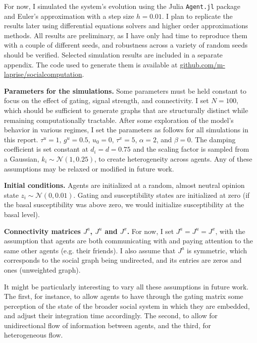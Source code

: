 \documentclass[]{article}
\begin{document}
For now, I simulated the system's evolution using the Julia \texttt{Agent.jl} package and Euler's approximation with a step size $h = 0.01$. I plan to replicate the results later using differential equations solvers and higher order approximations methods. All results are preliminary, as I have only had time to reproduce them with a couple of different seeds, and robustness across a variety of random seeds should be verified. Selected simulation results are included in a separate appendix. The code used to generate them is available at \href{http://github.com/m-laprise/socialcomputation}{github.com/m-laprise/socialcomputation}.

\textbf{Parameters for the simulations.} Some parameters must be held constant to focus on the effect of gating, signal strength, and connectivity. I set $N = 100$, which should be sufficient to generate graphs that are structurally distinct while remaining computationally tractable. After some exploration of the model's behavior in various regimes, I set the parameters as follows for all simulations in this report. $\tau^u = 1$, $g^u = 0.5$, $u_0=0$, $\tau^x = 5$, $\alpha = 2$, and $\beta = 0$. The damping coefficient is set constant at $d_i = d = 0.75$ and the scaling factor is sampled from a Gaussian, $k_i \sim \mathcal{N}(1,0.25)$, to create heterogeneity across agents. Any of these assumptions may be relaxed or modified in future work. 

\textbf{Initial conditions.} Agents are initialized at a random, almost neutral opinion state $z_i \sim \mathcal{N}(0, 0.01)$. Gating and susceptibility states are initialized at zero (if the basal susceptibility was above zero, we would initialize susceptibility at the basal level).

\textbf{Connectivity matrices $J^a$, $J^u$ and $J^x$.} For now, I set $J^a = J^u = J^x$, with the assumption that agents are both communicating with and paying attention to the same other agents (e.g. their friends). I also assume that $J^a$ is symmetric, which corresponds to the social graph being undirected, and its entries are zeros and ones (unweighted graph).

It might be particularly interesting to vary all these assumptions in future work. The first, for instance, to allow agents to have through the gating matrix some perception of the state of the broader social system in which they are embedded, and adjust their integration time accordingly. The second, to allow for unidirectional flow of information between agents, and the third, for heterogeneous flow.
\end{document}
